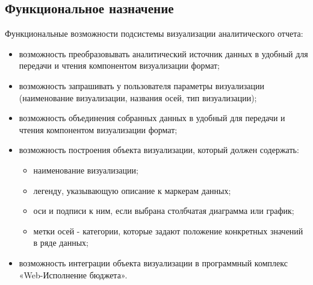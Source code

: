 \documentclass[a4paper]{extarticle}
\begin{document}
\subsection{Функциональное назначение}
Функциональные возможности подсистемы визуализации аналитического отчета:\par
\begin{itemize}
  \item возможность преобразовывать аналитический источник данных в удобный для передачи и чтения компонентом визуализации формат;
  \item возможность запрашивать у пользователя параметры визуализации (наименование визуализации, названия осей, тип визуализации);
  \item возможность объединения собранных данных в удобный для передачи и чтения компонентом визуализации формат;
  \item возможность построения объекта визуализации, который должен содержать:
    \begin{itemize}
    	\item наименование визуализации;
        \item легенду, указывающую описание к маркерам данных;
    	\item оси и подписи к ним, если выбрана столбчатая диаграмма или график;
        \item метки осей - категории, которые задают положение конкретных значений в ряде данных;
    \end{itemize}
  \item возможность интеграции объекта визуализации в программный комплекс «Web-Исполнение бюджета».
\end{itemize}\par
\end{document}

